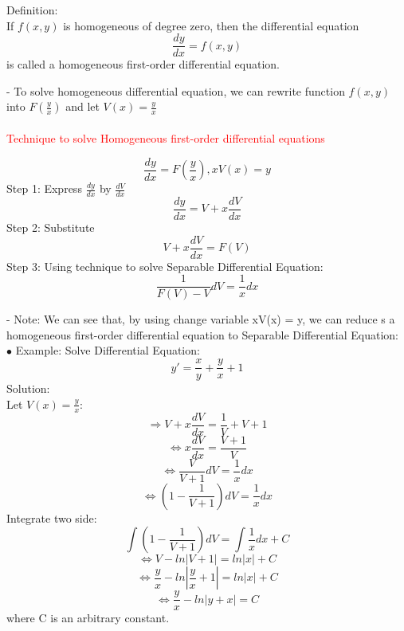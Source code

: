 \documentclass[12pt]{article}
\begin{document}
\begin{mybox}
    Definition: \\
    If $f(x, y)$ is homogeneous of degree zero, then the differential equation
    $$\frac{dy}{dx} = f(x,y)$$
    is called a homogeneous first-order differential equation.
\end{mybox}
- To solve homogeneous differential equation, we can rewrite function $f(x,y)$ into $F(\frac{y}{x})$ and let $V(x) = \frac{y}{x}$ \\
\\
\textcolor{red}{Technique to solve Homogeneous first-order differential equations}\\
\begin{mybox}
    $$\frac{dy}{dx} = F(\frac{y}{x}), xV(x) =y $$
    Step 1: Express $\frac{dy}{dx}$ by $\frac{dV}{dx}$ \\
    $$\frac{dy}{dx} = V + x\frac{dV}{dx}$$
    Step 2: Substitute\\ 
    $$V + x\frac{dV}{dx} = F(V)$$
    Step 3: Using technique to solve Separable Differential Equation: \\
    $$\frac{1}{F(V) -V}dV = \frac{1}{x}dx$$
\end{mybox}
- Note: We can see that, by using change variable xV(x) = y, we can reduce s a homogeneous first-order differential equation to Separable Differential Equation: \\
$\bullet$ Example: Solve Differential Equation: \\
$$y' =\frac{x}{y}+ \frac{y}{x} +1$$
Solution: 
\\ 
Let $V(x) = \frac{y}{x}$: 
$$\Rightarrow V + x\frac{dV}{dx} = \frac{1}{V} + V +1 $$
$$\Leftrightarrow x\frac{dV}{dx} = \frac{V+1}{V}$$
$$\Leftrightarrow \frac{V}{V+1}dV=\frac{1}{x}dx$$
$$\Leftrightarrow (1 - \frac{1}{V+1})dV = \frac{1}{x}dx$$
Integrate two side: 
\\
$$\int (1 - \frac{1}{V+1})dV = \int\frac{1}{x}dx +C $$
$$\Leftrightarrow V - ln|V+1| = ln|x| +C $$ 
$$\Leftrightarrow \frac{y}{x} - ln|\frac{y}{x} +1| =ln|x| +C$$
$$\Leftrightarrow \frac{y}{x} - ln|y+x| =C$$
where C is an arbitrary constant. 
\\
\end{document}
